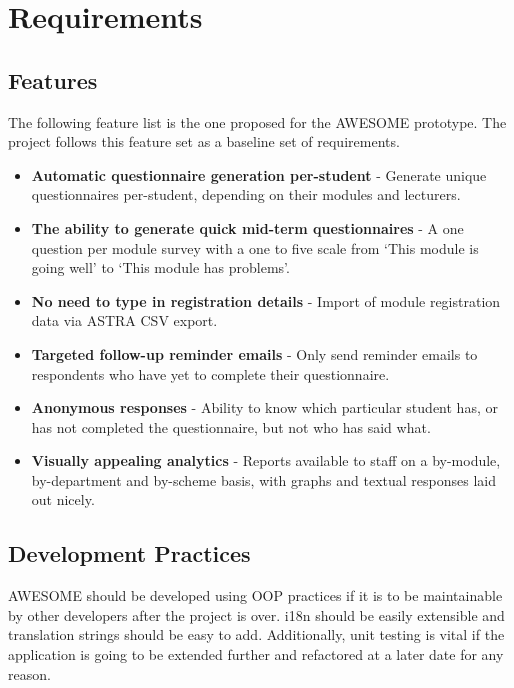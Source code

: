 \chapter{Requirements}

	\section{Features}
	
	The following feature list is the one proposed for the \ac{AWESOME} prototype.
	The project follows this feature set as a baseline set of requirements.
	
	\begin{itemize}
		\item \textbf{Automatic questionnaire generation per-student} - Generate unique questionnaires per-student, depending on their modules and lecturers.
		\item \textbf{The ability to generate quick mid-term questionnaires} - A one question per module survey with a one to five scale from `This module is going well' to `This module has problems'.
		\item \textbf{No need to type in registration details} - Import of module registration data via \ac{ASTRA} \ac{CSV} export.
		\item \textbf{Targeted follow-up reminder emails} - Only send reminder emails to respondents who have yet to complete their questionnaire.
		\item \textbf{Anonymous responses} - Ability to know which particular student has, or has not completed the questionnaire, but not who has said what.
		\item \textbf{Visually appealing analytics} - Reports available to staff on a by-module, by-department and by-scheme basis, with graphs and textual responses laid out nicely.
	\end{itemize}

	\section{Development Practices}
	
	\ac{AWESOME} should be developed using \ac{OOP} practices if it is to be maintainable by other developers after the project is over.
	\acl{i18n} should be easily extensible and translation strings should be easy to add.
	Additionally, unit testing is vital if the application is going to be extended further and refactored at a later date for any reason.
	
